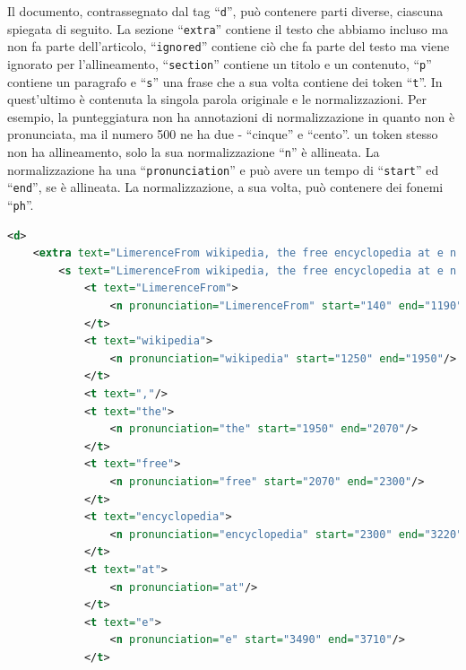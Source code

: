 \documentclass[12pt,a4paper,titlepage]{article}
\begin{document}
Il documento, contrassegnato dal tag ``\texttt{d}'', può contenere parti diverse, ciascuna spiegata di seguito. La sezione ``\texttt{extra}'' contiene il testo che abbiamo incluso ma non fa parte dell'articolo, ``\texttt{ignored}'' contiene ciò che fa parte del testo ma viene ignorato per l'allineamento, ``\texttt{section}'' contiene un titolo e un contenuto, ``\texttt{p}'' contiene un paragrafo  e ``\texttt{s}'' una frase che a sua volta contiene dei token ``\texttt{t}''. In quest'ultimo è contenuta la singola parola originale e le normalizzazioni. Per esempio, la punteggiatura non ha annotazioni di normalizzazione in quanto non è pronunciata, ma il numero 500 ne ha due - ``cinque'' e ``cento''. un token stesso non ha allineamento, solo la sua normalizzazione ``\texttt{n}'' è allineata. La normalizzazione ha una ``\texttt{pronunciation}'' e può avere un tempo di ``\texttt{start}'' ed ``\texttt{end}'', se è allineata. La normalizzazione, a sua volta, può contenere dei fonemi ``\texttt{ph}''.

\begin{lstlisting}[language=XML,firstnumber=1, caption=Annotazioni delle parole in un audio, label=annotazioni,captionpos=b]
<d>
	<extra text="LimerenceFrom wikipedia, the free encyclopedia at e n dot wikipedia dot org.">
		<s text="LimerenceFrom wikipedia, the free encyclopedia at e n dot wikipedia dot org.">
			<t text="LimerenceFrom">
				<n pronunciation="LimerenceFrom" start="140" end="1190"/>
			</t>
			<t text="wikipedia">
				<n pronunciation="wikipedia" start="1250" end="1950"/>
			</t>
			<t text=","/>
			<t text="the">
				<n pronunciation="the" start="1950" end="2070"/>
			</t>
			<t text="free">
				<n pronunciation="free" start="2070" end="2300"/>
			</t>
			<t text="encyclopedia">
				<n pronunciation="encyclopedia" start="2300" end="3220"/>
			</t>
			<t text="at">
				<n pronunciation="at"/>
			</t>
			<t text="e">
				<n pronunciation="e" start="3490" end="3710"/>
			</t>
\end{lstlisting}
\end{document}

